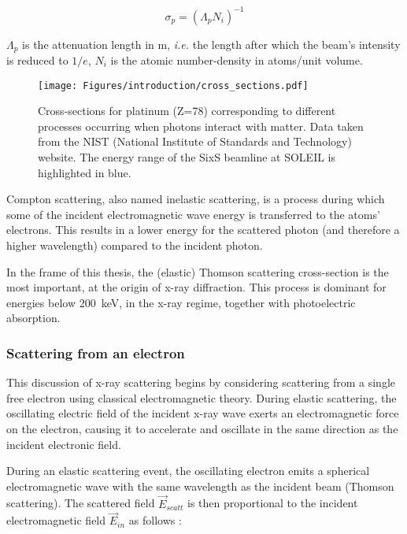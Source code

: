 \begin{equation}
	\sigma_p = (\Lambda_p N_i)^{-1}
\end{equation}

$\Lambda_p$ is the attenuation length in \unit{\meter}, \textit{i.e.} the length after which the beam's intensity is reduced to $1/e$, $N_i$ is the atomic number-density in atoms/unit volume.

\begin{figure}[!htb]
    \centering
    \texttt{[image: Figures/introduction/cross\_sections.pdf]}
    \caption{
        Cross-sections for platinum (Z=78) corresponding to different processes occurring when photons interact with matter.
        Data taken from the NIST (National Institute of Standards and Technology) \parencite{NIST_cross_sections} website.
        The energy range of the SixS beamline at SOLEIL is highlighted in blue.
    }
    \label{fig:cross_sections}
\end{figure}

Compton scattering, also named inelastic scattering, is a process during which some of the incident electromagnetic wave energy is transferred to the atoms' electrons.
This results in a lower energy for the scattered photon (and therefore a higher wavelength) compared to the incident photon.

In the frame of this thesis, the (elastic) Thomson scattering cross-section is the most important, at the origin of x-ray diffraction.
This process is dominant for energies below \qty{200}{\keV}, in the x-ray regime, together with photoelectric absorption.

\subsubsection{Scattering from an electron}

This discussion of x-ray scattering begins by considering scattering from a single free electron using classical electromagnetic theory.
During elastic scattering, the oscillating electric field of the incident x-ray wave exerts an electromagnetic force on the electron, causing it to accelerate and oscillate in the same direction as the incident electronic field.

During an elastic scattering event, the oscillating electron emits a spherical electromagnetic wave with the same wavelength as the incident beam (Thomson scattering).
The scattered field $\vec{E}_{scatt}$ is then proportional to the incident electromagnetic field $\vec{E}_{in}$ as follows \parencite{NielsenMcMorrow}:

